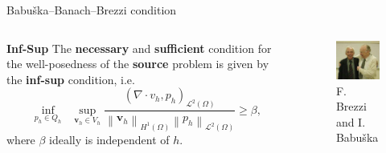 \documentclass{beamer}
\let\vec\mathbf
\newcommand{\norm}[1]{\left\lVert#1\right\rVert}
\begin{document}
	\begin{frame}{Babu\v{s}ka--Banach--Brezzi condition}
		\begin{columns}[T] 
			\begin{column}{0.65\textwidth} 
			
			\vspace{0.2cm} 
			\begin{block}{\textbf{\color{oxfordblue} Inf-Sup}}
				The \textbf{\color{oxfordblue}necessary} and \textbf{\color{oxfordblue}sufficient} condition for the well-posedness of the \textbf{\color{oxfordblue}source} problem is given by the \textbf{\color{oxfordblue}inf-sup} condition, i.e.
				\begin{equation}
					\underset{p_h \in Q_h}{\inf}\;\;\underset{\vec{v}_h\in V_h}{\sup} \frac{(\nabla\cdot v_h,p_h)_{\mathcal{L}^2(\Omega)}}{\norm{\vec{v}_h}_{H^1(\Omega)}\norm{p_h}_{\mathcal{L}^2(\Omega)}}\geq \beta,\nonumber 
				\end{equation}
				where $\beta$ ideally is independent of $h$.
			\end{block}
			\end{column} 
			
			\begin{column}{0.35\textwidth} 
				\vspace{1cm}
				\begin{figure} 
					\centering 
					\includegraphics[width=1\textwidth]{Figures/BBB.jpeg} 
					\caption*{\tiny{F. Brezzi and I. Babu\v{s}ka}} 
				\end{figure} 
			\end{column} 
		\end{columns} 
	\end{frame}
\end{document}
